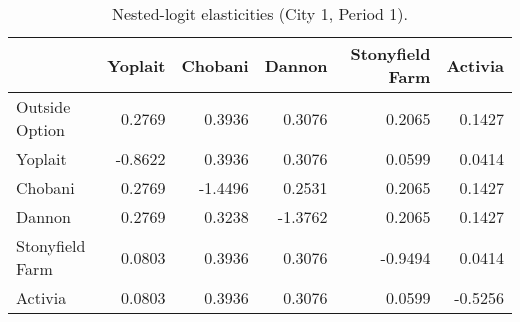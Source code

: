 \begin{table}[H]
\centering
\caption{Nested-logit elasticities (City 1, Period 1).}
\label{tab:q21_elast}
\begin{tabular}{lrrrrr}
\toprule
 & Yoplait & Chobani & Dannon & Stonyfield Farm & Activia \\
\midrule
Outside Option & 0.2769 & 0.3936 & 0.3076 & 0.2065 & 0.1427 \\
Yoplait & -0.8622 & 0.3936 & 0.3076 & 0.0599 & 0.0414 \\
Chobani & 0.2769 & -1.4496 & 0.2531 & 0.2065 & 0.1427 \\
Dannon & 0.2769 & 0.3238 & -1.3762 & 0.2065 & 0.1427 \\
Stonyfield Farm & 0.0803 & 0.3936 & 0.3076 & -0.9494 & 0.0414 \\
Activia & 0.0803 & 0.3936 & 0.3076 & 0.0599 & -0.5256 \\
\bottomrule
\end{tabular}
\end{table}
